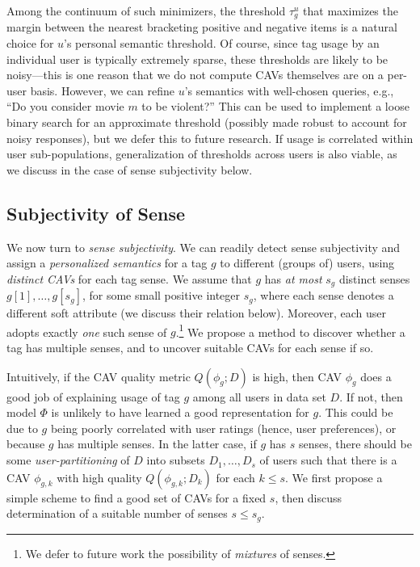 \documentclass[manuscript,screen,nonacm]{acmart}
\newcommand{\1}{{\mathbf 1}}
\theoremstyle{TheoremNum}
\begin{document}
Among the continuum of such minimizers, the threshold $\tau^u_{g}$ that maximizes the margin between the nearest bracketing positive and negative items is a natural choice for $u$'s personal semantic threshold. Of course, since tag usage by an individual user is typically extremely sparse, these thresholds are likely to be noisy---this is one reason that we do not compute CAVs themselves are on a per-user basis.
However, we can refine $u$'s semantics with well-chosen queries, e.g., ``Do you consider movie $m$ to be violent?'' This can be used to implement a loose binary search for an approximate threshold (possibly made robust to account for noisy responses), but we defer this to future research. If usage is correlated within user sub-populations, generalization of thresholds across users is also viable, as we discuss in the case of sense subjectivity below.


\subsection{Subjectivity of Sense}
\label{sec:subjectiveSense}

We now turn to \emph{sense subjectivity}. We can readily detect sense subjectivity and assign a \emph{personalized semantics} for a tag $g$ to different (groups of) users, using \emph{distinct CAVs} for each tag sense. We assume that $g$ has \emph{at most} $s_g$ distinct senses $g[1],\ldots, g[s_g]$, for some small 
positive integer $s_g$, where each sense denotes a different soft attribute (we discuss their relation below). Moreover, each user adopts exactly \emph{one} such sense of $g$.\footnote{We defer to future work the possibility of \emph{mixtures} of senses.}
We propose a method to discover whether a tag has multiple senses, and to uncover suitable CAVs for each sense if so.

Intuitively, if the CAV quality metric $Q(\phi_g; D)$ is high, then CAV $\phi_g$ does a good job of explaining usage of tag $g$ among all users in data set $D$. If not, then model $\Phi$ is unlikely to have learned a good representation for $g$. This could be due to $g$ being poorly correlated with user ratings (hence, user preferences), or because $g$ has multiple senses. In the latter case, if $g$ has $s$ senses, there should be some \emph{user-partitioning} of $D$ into subsets $D_1, \ldots, D_s$ of users such that there is a CAV $\phi_{g,k}$ with high quality $Q(\phi_{g,k}; D_k)$ for each $k\leq s$. We first propose a simple scheme to find a good set of CAVs for a fixed $s$, then discuss determination of a suitable number of senses $s \leq s_g$.
\end{document}
